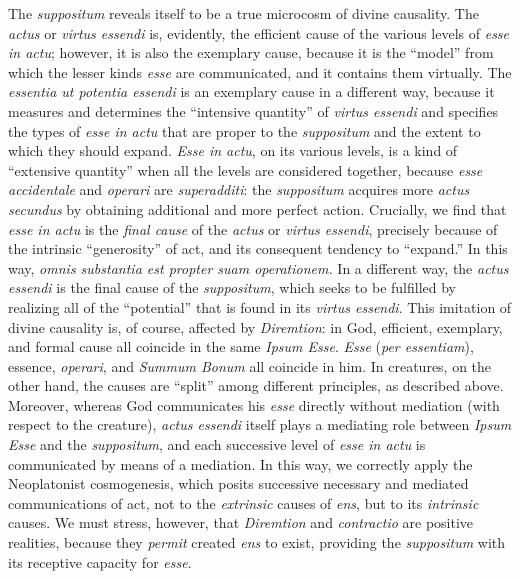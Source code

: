 The \emph{suppositum} reveals itself to be a true microcosm of divine causality. The \emph{actus} or \emph{virtus essendi} is, evidently, the efficient cause of the various levels of \emph{esse in actu}; however, it is also the exemplary cause, because it is the “model” from which the lesser kinds \emph{esse} are communicated, and it contains them virtually. The \emph{essentia ut potentia essendi} is an exemplary cause in a different way, because it measures and determines the “intensive quantity” of \emph{virtus essendi} and specifies the types of \emph{esse in actu} that are proper to the \emph{suppositum} and the extent to which they should expand. \emph{Esse in actu}, on its various levels, is a kind of “extensive quantity” when all the levels are considered together, because \emph{esse accidentale} and \emph{operari} are \emph{superadditi}: the \emph{suppositum} acquires more \emph{actus secundus} by obtaining additional and more perfect action. Crucially, we find that \emph{esse in actu} is the \emph{final cause} of the \emph{actus} or \emph{virtus essendi}, precisely because of the intrinsic “generosity” of act, and its consequent tendency to “expand.” In this way, \emph{omnis substantia est propter suam operationem.} In a different way, the \emph{actus essendi} is the final cause of the \emph{suppositum}, which seeks to be fulfilled by realizing all of the “potential” that is found in its \emph{virtus essendi}. This imitation of divine causality is, of course, affected by \emph{Diremtion}: in God, efficient, exemplary, and formal cause all coincide in the same \emph{Ipsum Esse}. \emph{Esse} (\emph{per essentiam}), essence, \emph{operari}, and \emph{Summum Bonum} all coincide in him. In creatures, on the other hand, the causes are “split” among different principles, as described above. Moreover, whereas God communicates his \emph{esse} directly without mediation (with respect to the creature), \emph{actus essendi} itself plays a mediating role between \emph{Ipsum Esse} and the \emph{suppositum}, and each successive level of \emph{esse in actu} is communicated by means of a mediation. In this way, we correctly apply the Neoplatonist cosmogenesis, which posits successive necessary and mediated communications of act, not to the \emph{extrinsic} causes of \emph{ens}, but to its \emph{intrinsic} causes. We must stress, however, that \emph{Diremtion} and \emph{contractio} are positive realities, because they \emph{permit} created \emph{ens} to exist, providing the \emph{suppositum} with its receptive capacity for \emph{esse}.

